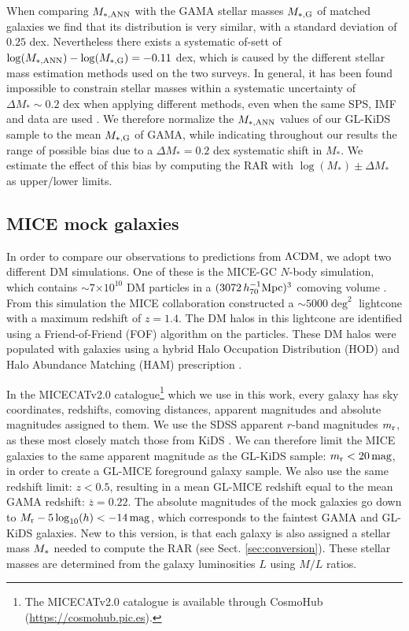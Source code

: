 \documentclass[usenatbib]{mnras}
\newcommand{\magn}{\, {\rm mag} }
\newcommand{\hsMpc}{\, h_{70}^{-1}{\rm{Mpc}} }
\newcommand{\lcdm}{{\rm \Lambda CDM}}
\newcommand*{\mean}[1]{\overline{#1}}
\newcommand*{\E}[1]{\times 10^{#1}}
\newcommand{\un}[1]{_{\rm #1}}
\begin{document}
When comparing $M\un{*,ANN}$ with the GAMA stellar masses $M\un{*,G}$ of matched galaxies we find that its distribution is very similar, with a standard deviation of $0.25$ dex. Nevertheless there exists a systematic of-sett of $\log(M\un{*,ANN}) - \log(M\un{*,G}) = -0.11$ dex, which is caused by the different stellar mass estimation methods used on the two surveys. In general, it has been found impossible to constrain stellar masses within a systematic uncertainty of $\Delta M_* \sim 0.2$ dex  when applying different methods, even when the same SPS, IMF and data are used \cite[]{taylor2011,wright2017}. We therefore normalize the $M\un{*,ANN}$ values of our GL-KiDS sample to the mean $M\un{*,G}$ of GAMA, while indicating throughout our results the range of possible bias due to a $\Delta M_*=0.2$ dex systematic shift in $M_*$. We estimate the effect of this bias by computing the RAR with $\log(M_*)\pm\Delta M_*$ as upper/lower limits.


\subsection{MICE mock galaxies}
\label{sec:mice_mocks}

In order to compare our observations to predictions from $\lcdm$, we adopt two different DM simulations. One of these is the MICE-GC $N$-body simulation, which contains $\sim 7$$\E{10}$ DM particles in a $(3072 \hsMpc)^3$ comoving volume \cite[]{fosalba2015b}. From this simulation the MICE collaboration constructed a $\sim5000\deg^2$ lightcone with a maximum redshift of $z=1.4$. The DM halos in this lightcone are identified using a Friend-of-Friend (FOF) algorithm on the particles. These DM halos were populated with galaxies using a hybrid Halo Occupation Distribution (HOD) and Halo Abundance Matching (HAM) prescription \cite[]{carretero2015,crocce2015}.

In the MICECATv2.0 catalogue\footnote{The MICECATv2.0 catalogue is available through CosmoHub (\url{https://cosmohub.pic.es}).} which we use in this work, every galaxy has sky coordinates, redshifts, comoving distances, apparent magnitudes and absolute magnitudes assigned to them. We use the SDSS apparent $r$-band magnitudes $m\un{r}$, as these most closely match those from KiDS \cite[see][]{brouwer2018}. We can therefore limit the MICE galaxies to the same apparent magnitude as the GL-KiDS sample: $m\un{r}<20 \, {\rm mag}$, in order to create a GL-MICE foreground galaxy sample. We also use the same redshift limit: $z<0.5$, resulting in a mean GL-MICE redshift equal to the mean GAMA redshift: $\mean{z}=0.22$. The absolute magnitudes of the mock galaxies go down to $M\un{r} - 5\log_{10}(h) < -14 \magn$, which corresponds to the faintest GAMA and GL-KiDS galaxies. New to this version, is that each galaxy is also assigned a stellar mass $M\un{*}$ needed to compute the RAR (see Sect. \ref{sec:conversion}). These stellar masses are determined from the galaxy luminosities $L$ using \cite{bell2001} $M/L$ ratios.
\end{document}
